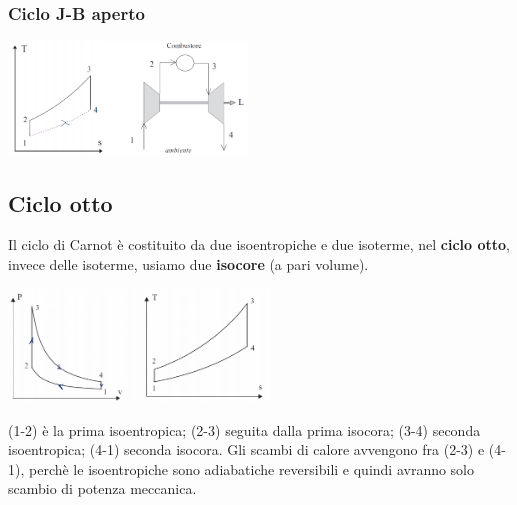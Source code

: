 \subsubsection{Ciclo J-B aperto}
\begin{center}
    \includegraphics[height=3cm]{../L07/img9.PNG}
\end{center}
\subsection{Ciclo otto}
Il ciclo di Carnot è costituito da due isoentropiche e due isoterme, nel \textbf{ciclo otto}, invece delle isoterme, usiamo due \textbf{isocore} (a pari volume).
\begin{center}
    \includegraphics[height=3cm]{../L07/img10.PNG}
\end{center}
(1-2) è la prima isoentropica;\newline
(2-3) seguita dalla prima isocora;\newline
(3-4) seconda isoentropica;\newline
(4-1) seconda isocora.\newline
\newline
Gli scambi di calore avvengono fra (2-3) e (4-1), perchè le isoentropiche sono adiabatiche reversibili e quindi avranno solo scambio di potenza meccanica.\newline
\newline
